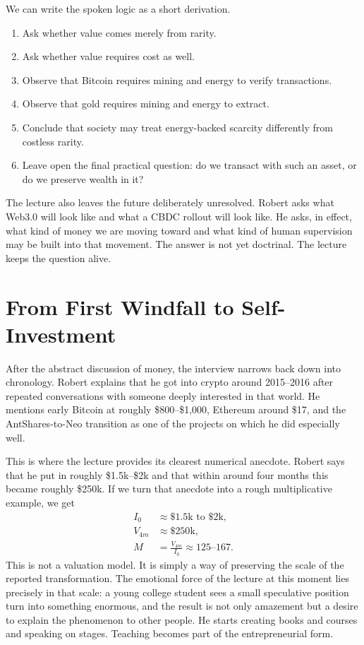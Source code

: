We can write the spoken logic as a short derivation.
\begin{enumerate}
\item Ask whether value comes merely from rarity.
\item Ask whether value requires cost as well.
\item Observe that Bitcoin requires mining and energy to verify transactions.
\item Observe that gold requires mining and energy to extract.
\item Conclude that society may treat energy-backed scarcity differently from costless rarity.
\item Leave open the final practical question: do we transact with such an asset, or do we preserve wealth in it?
\end{enumerate}

The lecture also leaves the future deliberately unresolved. Robert asks what Web3.0 will look like and what a CBDC rollout will look like. He asks, in effect, what kind of money we are moving toward and what kind of human supervision may be built into that movement. The answer is not yet doctrinal. The lecture keeps the question alive.

\section{From First Windfall to Self-Investment}

After the abstract discussion of money, the interview narrows back down into chronology. Robert explains that he got into crypto around 2015--2016 after repeated conversations with someone deeply interested in that world. He mentions early Bitcoin at roughly \$800--\$1,000, Ethereum around \$17, and the AntShares-to-Neo transition as one of the projects on which he did especially well.

This is where the lecture provides its clearest numerical anecdote. Robert says that he put in roughly \$1.5k--\$2k and that within around four months this became roughly \$250k. If we turn that anecdote into a rough multiplicative example, we get
\begin{align}
I_0 &\approx \$1.5\text{k} \text{ to } \$2\text{k},\\
V_{4m} &\approx \$250\text{k},\\
M &= \frac{V_{4m}}{I_0} \approx 125\text{--}167.
\end{align}
This is not a valuation model. It is simply a way of preserving the scale of the reported transformation. The emotional force of the lecture at this moment lies precisely in that scale: a young college student sees a small speculative position turn into something enormous, and the result is not only amazement but a desire to explain the phenomenon to other people. He starts creating books and courses and speaking on stages. Teaching becomes part of the entrepreneurial form.

